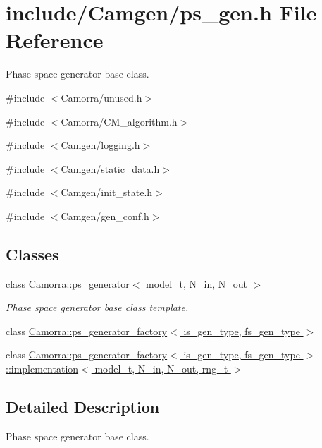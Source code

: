 \hypertarget{a00615}{
\section{include/Camgen/ps\_\-gen.h File Reference}
\label{a00615}
}


Phase space generator base class.  


{\ttfamily \#include $<$Camorra/unused.h$>$}\par
{\ttfamily \#include $<$Camorra/CM\_\-algorithm.h$>$}\par
{\ttfamily \#include $<$Camgen/logging.h$>$}\par
{\ttfamily \#include $<$Camgen/static\_\-data.h$>$}\par
{\ttfamily \#include $<$Camgen/init\_\-state.h$>$}\par
{\ttfamily \#include $<$Camgen/gen\_\-conf.h$>$}\par
\subsection*{Classes}
\begin{DoxyCompactItemize}
\item 
class \hyperlink{a00432}{Camorra::ps\_\-generator$<$ model\_\-t, N\_\-in, N\_\-out $>$}
\begin{DoxyCompactList}\small\item\em Phase space generator base class template. \end{DoxyCompactList}\item 
class \hyperlink{a00434}{Camorra::ps\_\-generator\_\-factory$<$ is\_\-gen\_\-type, fs\_\-gen\_\-type $>$}
\item 
class \hyperlink{a00295}{Camorra::ps\_\-generator\_\-factory$<$ is\_\-gen\_\-type, fs\_\-gen\_\-type $>$::implementation$<$ model\_\-t, N\_\-in, N\_\-out, rng\_\-t $>$}
\end{DoxyCompactItemize}


\subsection{Detailed Description}
Phase space generator base class. 
